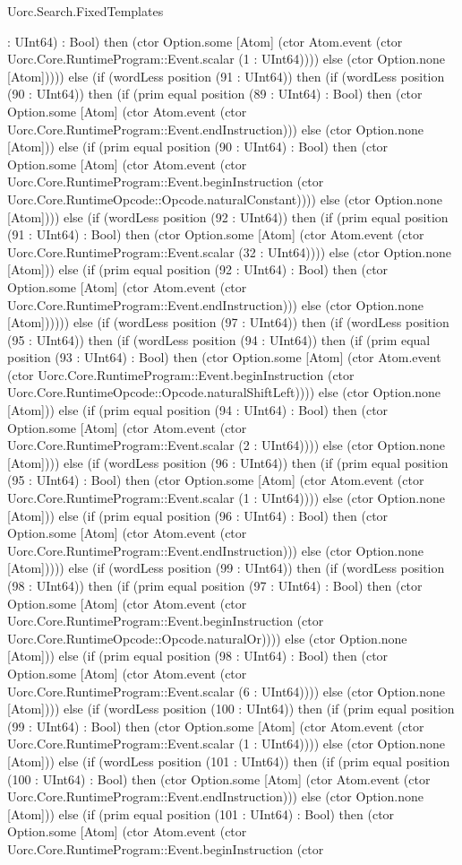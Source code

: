 \begin{lexlean}{Uorc.Search.FixedTemplates}
\begin{semanticmodule}
{: UInt64) : Bool) then (ctor Option.some [Atom] (ctor Atom.event (ctor Uorc.Core.RuntimeProgram::Event.scalar (1 : UInt64)))) else (ctor Option.none [Atom])))) else (if (wordLess position (91 : UInt64)) then (if (wordLess position (90 : UInt64)) then (if (prim equal position (89 : UInt64) : Bool) then (ctor Option.some [Atom] (ctor Atom.event (ctor Uorc.Core.RuntimeProgram::Event.endInstruction))) else (ctor Option.none [Atom])) else (if (prim equal position (90 : UInt64) : Bool) then (ctor Option.some [Atom] (ctor Atom.event (ctor Uorc.Core.RuntimeProgram::Event.beginInstruction (ctor Uorc.Core.RuntimeOpcode::Opcode.naturalConstant)))) else (ctor Option.none [Atom]))) else (if (wordLess position (92 : UInt64)) then (if (prim equal position (91 : UInt64) : Bool) then (ctor Option.some [Atom] (ctor Atom.event (ctor Uorc.Core.RuntimeProgram::Event.scalar (32 : UInt64)))) else (ctor Option.none [Atom])) else (if (prim equal position (92 : UInt64) : Bool) then (ctor Option.some [Atom] (ctor Atom.event (ctor Uorc.Core.RuntimeProgram::Event.endInstruction))) else (ctor Option.none [Atom]))))) else (if (wordLess position (97 : UInt64)) then (if (wordLess position (95 : UInt64)) then (if (wordLess position (94 : UInt64)) then (if (prim equal position (93 : UInt64) : Bool) then (ctor Option.some [Atom] (ctor Atom.event (ctor Uorc.Core.RuntimeProgram::Event.beginInstruction (ctor Uorc.Core.RuntimeOpcode::Opcode.naturalShiftLeft)))) else (ctor Option.none [Atom])) else (if (prim equal position (94 : UInt64) : Bool) then (ctor Option.some [Atom] (ctor Atom.event (ctor Uorc.Core.RuntimeProgram::Event.scalar (2 : UInt64)))) else (ctor Option.none [Atom]))) else (if (wordLess position (96 : UInt64)) then (if (prim equal position (95 : UInt64) : Bool) then (ctor Option.some [Atom] (ctor Atom.event (ctor Uorc.Core.RuntimeProgram::Event.scalar (1 : UInt64)))) else (ctor Option.none [Atom])) else (if (prim equal position (96 : UInt64) : Bool) then (ctor Option.some [Atom] (ctor Atom.event (ctor Uorc.Core.RuntimeProgram::Event.endInstruction))) else (ctor Option.none [Atom])))) else (if (wordLess position (99 : UInt64)) then (if (wordLess position (98 : UInt64)) then (if (prim equal position (97 : UInt64) : Bool) then (ctor Option.some [Atom] (ctor Atom.event (ctor Uorc.Core.RuntimeProgram::Event.beginInstruction (ctor Uorc.Core.RuntimeOpcode::Opcode.naturalOr)))) else (ctor Option.none [Atom])) else (if (prim equal position (98 : UInt64) : Bool) then (ctor Option.some [Atom] (ctor Atom.event (ctor Uorc.Core.RuntimeProgram::Event.scalar (6 : UInt64)))) else (ctor Option.none [Atom]))) else (if (wordLess position (100 : UInt64)) then (if (prim equal position (99 : UInt64) : Bool) then (ctor Option.some [Atom] (ctor Atom.event (ctor Uorc.Core.RuntimeProgram::Event.scalar (1 : UInt64)))) else (ctor Option.none [Atom])) else (if (wordLess position (101 : UInt64)) then (if (prim equal position (100 : UInt64) : Bool) then (ctor Option.some [Atom] (ctor Atom.event (ctor Uorc.Core.RuntimeProgram::Event.endInstruction))) else (ctor Option.none [Atom])) else (if (prim equal position (101 : UInt64) : Bool) then (ctor Option.some [Atom] (ctor Atom.event (ctor Uorc.Core.RuntimeProgram::Event.beginInstruction (ctor }
\end{semanticmodule}
\end{lexlean}
